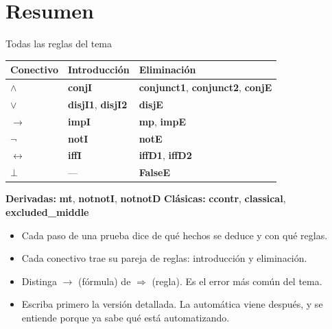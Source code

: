 \documentclass[11pt,aspectratio=169]{beamer}
\newcommand{\Rn}[1]{\textcolor{granate}{\textbf{#1}}}
\begin{document}
\section{Resumen}

\begin{frame}[fragile]{Todas las reglas del tema}
  \begin{center}
  \small
  \begin{tabular}{lll}
    \toprule
    \bfseries Conectivo & \bfseries Introducción & \bfseries Eliminación\\
    \midrule
    
    \(\wedge\) & \Rn{conjI} & \Rn{conjunct1}, \Rn{conjunct2}, \Rn{conjE}\\
    
    \(\vee\) & \Rn{disjI1}, \Rn{disjI2} & \Rn{disjE}\\
    
    \(\longrightarrow\) & \Rn{impI} & \Rn{mp}, \Rn{impE}\\
    
    \(\neg\) & \Rn{notI} & \Rn{notE}\\
    
    \(\longleftrightarrow\) & \Rn{iffI} & \Rn{iffD1}, \Rn{iffD2}\\
    
    \(\bot\) & --- & \Rn{FalseE}\\
    \bottomrule
  \end{tabular}
  \end{center}
  \vfill
  
  \small
  \textbf{Derivadas:} \Rn{mt}, \Rn{notnotI}, \Rn{notnotD}\qquad
  \textbf{Clásicas:} \Rn{ccontr}, \Rn{classical}, \Rn{excluded\_middle}
  \vfill
\end{frame}

\begin{frame}
  \begin{itemize}
    \item Cada paso de una prueba dice \alert{de qué hechos se deduce} y
      \alert{con qué reglas}.
    
    \item Cada conectivo trae su pareja de reglas: introducción y
      eliminación.
    
    \item Distinga \(\longrightarrow\) (fórmula) de \(\Longrightarrow\)
      (regla). Es el error más común del tema.
    
    \item Escriba primero la versión detallada. La automática viene
      después, y se entiende porque ya sabe qué está automatizando.
  \end{itemize}
  \vfill
\end{frame}
\end{document}
